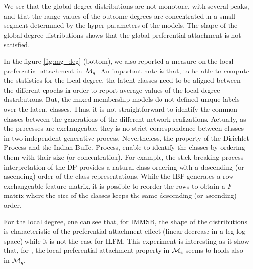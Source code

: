 We see that the global degree distributions are not monotone, with several peaks, and that the range values of the outcome degrees are concentrated in a small segment determined by the hyper-parameters of the models. The shape of the global degree distributions shows that the global preferential attachment is not satisfied. 


In the figure \ref{fig:mg_deg} (bottom), we also reported a measure on the local preferential attachment in $\mathcal{M}_g$. An important note is that, to be able to compute the statistics for the local degree, the latent classes need to be aligned between the different epochs in order to report average values of the local degree distributions. But, the mixed membership models do not defined unique labels over the latent classes. Thus, it is not straightforward to identify the common classes between the generations of the different network realizations. Actually, as the processes are exchangeable, they is no strict correspondence between classes in two independent generative process. Nevertheless, the property of the Dirichlet Process and the Indian Buffet Process, enable to identify the classes by ordering them with their size (or concentration). For example, the stick breaking process interpretation of the DP provides a natural class ordering with a descending (or ascending) order of the class representations. While the IBP generates a row-exchangeable feature matrix, it is possible to reorder the rows to obtain a $F$ matrix where the size of the classes keeps the same descending (or ascending) order.

For the local degree, one can see that, for IMMSB, the shape of the distributions is characteristic of the preferential attachment effect (linear decrease in a log-log space) while it is not the case for ILFM. This experiment is interesting as it show that, for \imb, the local preferential attachment property in $\mathcal{M}_e$ seems to holds also in $\mathcal{M}_g$.





